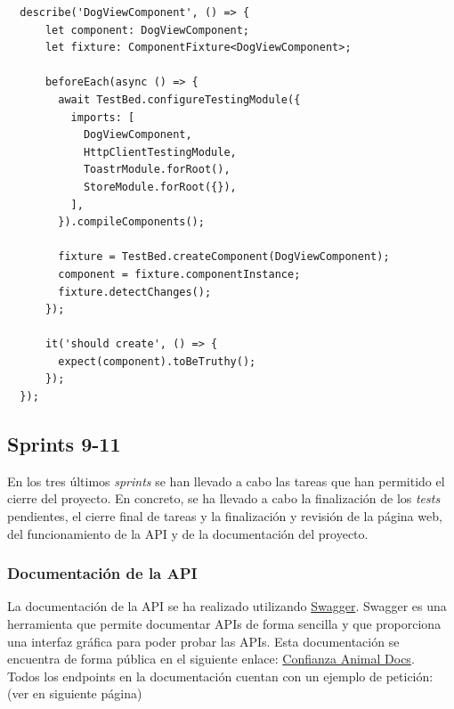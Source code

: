 \begin{lstlisting}
  describe('DogViewComponent', () => {
      let component: DogViewComponent;
      let fixture: ComponentFixture<DogViewComponent>;

      beforeEach(async () => {
        await TestBed.configureTestingModule({
          imports: [
            DogViewComponent,
            HttpClientTestingModule,
            ToastrModule.forRoot(),
            StoreModule.forRoot({}),
          ],
        }).compileComponents();

        fixture = TestBed.createComponent(DogViewComponent);
        component = fixture.componentInstance;
        fixture.detectChanges();
      });

      it('should create', () => {
        expect(component).toBeTruthy();
      });
  });
\end{lstlisting}



\subsection{Sprints 9-11}\label{subsec:sprints-9-11}

En los tres últimos \textit{sprints} se han llevado a cabo las tareas que han permitido el cierre del proyecto. En concreto, se ha
llevado a cabo la finalización de los \textit{tests} pendientes, el cierre final de tareas y la finalización
y revisión de la página web, del funcionamiento de la API y de la documentación del proyecto.

\subsubsection{Documentación de la API}\label{subsubsec:documentacion-api}

La documentación de la API se ha realizado utilizando \href{https://www.swagger.io/}{Swagger}. Swagger es una herramienta que permite
documentar APIs de forma sencilla y que proporciona una interfaz gráfica para poder probar las APIs. Esta documentación
se encuentra de forma pública en el siguiente enlace: \href{https://confianza-animal-backend.onrender.com/docs}{Confianza Animal Docs}. \\

Todos los endpoints en la documentación cuentan con un ejemplo de petición: (ver en siguiente página)

